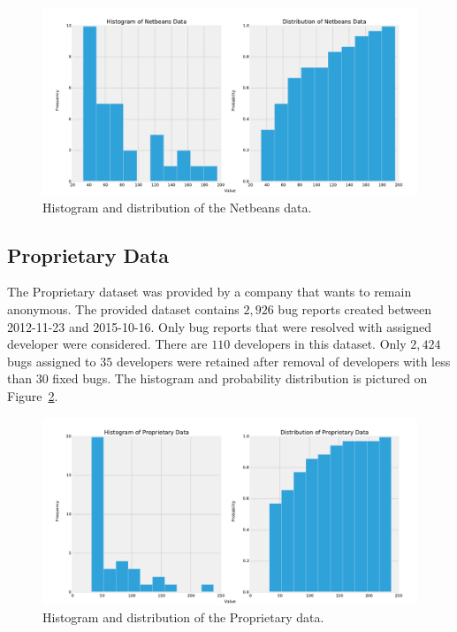 \begin{figure}[htbp]
    \centering
        \includegraphics[width=\textwidth]{./images/distribution/netbeans.pdf}
    \caption{Histogram and distribution of the Netbeans data.}
    \label{fig:datasets.netbeans.dist}
\end{figure}

\subsection{Proprietary Data}

The Proprietary dataset was provided by a company that wants to remain anonymous. The provided dataset contains $2,926$ bug reports created between 2012-11-23 and 2015-10-16. Only bug reports that were resolved with assigned developer were considered. There are $110$ developers in this dataset. Only $2,424$ bugs assigned to $35$ developers were retained after removal of developers with less than $30$ fixed bugs. The histogram and probability distribution is pictured on Figure~\ref{fig:datasets.proprietary.dist}.

\begin{figure}[htbp]
    \centering
        \includegraphics[width=\textwidth]{./images/distribution/proprietary.pdf}
    \caption{Histogram and distribution of the Proprietary data.}
    \label{fig:datasets.proprietary.dist}
\end{figure}

